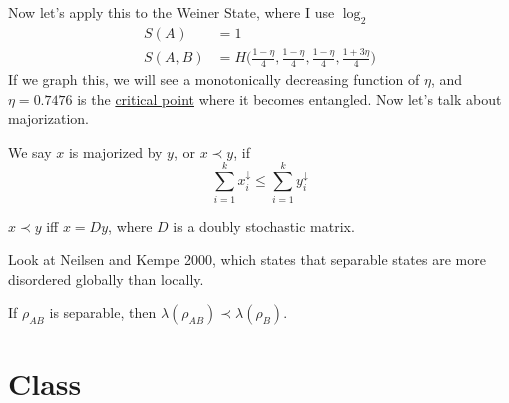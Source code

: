 \documentclass{article}
\newcounter{theorem}[section]
\newcounter{definition}[section]
\begin{document}
  Now let's apply this to the Weiner State, where I use $\log_2$
  \begin{align}
    S(A) & = 1  \\
    S(A, B) & = H \bigg( \frac{1 - \eta}{4} , \frac{1 - \eta}{4}, \frac{1 - \eta}{4}, \frac{1 + 3\eta}{4} \bigg)
  \end{align} 
  If we graph this, we will see a monotonically decreasing function of $\eta$, and $\eta = 0.7476$ is the \hyperref[real-def:critical-point]{critical point} where it becomes entangled. Now let's talk about majorization. 

  \begin{definition}[Majorization]
    \label{def:majorization}
    We say $x$ is majorized by $y$, or $x \prec y$, if 
    \begin{equation}
      \sum_{i=1}^k x_i^{\downarrow} \leq \sum_{i=1}^k y_i^{\downarrow}
    \end{equation}
  \end{definition}

  \begin{theorem}
    \label{thm:equivalent-property-for-majorization}
    $x \prec y$ iff $x = D y$, where $D$ is a doubly stochastic matrix. 
  \end{theorem}

  Look at Neilsen and Kempe 2000, which states that separable states are more disordered globally than locally. 

  \begin{theorem}
    \label{thm:majorization-criterion-for-separability}
    If $\rho_{AB}$ is separable, then $\lambda (\rho_{AB}) \prec \lambda (\rho_B)$. 
  \end{theorem}

\section{Class} 
\end{document}
